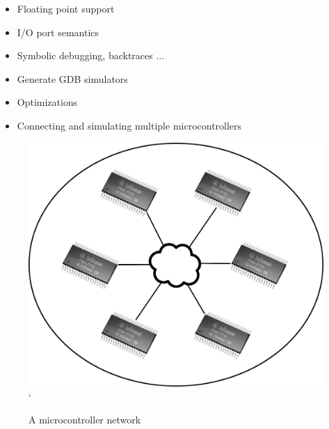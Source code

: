 \begin{block}{\large {}\vphantom{Future Work}}
    \begin{itemize}
        \item Floating point support
        \item I/O port semantics
        \item Symbolic debugging, backtraces ...
        \item Generate GDB simulators
        \item Optimizations
		\item Connecting and simulating multiple microcontrollers
    \end{itemize}
	\begin{figure}
		\includegraphics[width=\linewidth]{figures/netwerk.png}`
		\caption{A microcontroller network}
	\end{figure}
\end{block}
